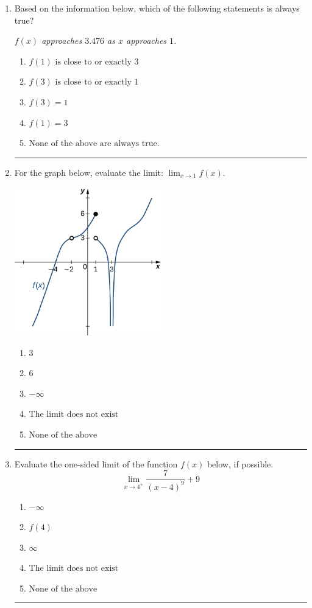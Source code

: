 \documentclass[14pt]{extbook}
\newcommand{\litem}[1]{\item#1\hspace*{-1cm}\rule{\textwidth}{0.4pt}}
\begin{document}
\begin{enumerate}
{\begin{enumerate}[label=\Alph*.]
\end{enumerate} }
\litem{
Based on the information below, which of the following statements is always true?
\begin{center}
    \textit{ $f(x)$ approaches $3.476$ as $x$ approaches $1$. }
\end{center}
\begin{enumerate}[label=\Alph*.]
\item \( f(1) \text{ is close to or exactly } 3 \)
\item \( f(3) \text{ is close to or exactly } 1 \)
\item \( f(3) = 1 \)
\item \( f(1) = 3 \)
\item \( \text{None of the above are always true.} \)

\end{enumerate} }
\litem{
For the graph below, evaluate the limit: $ \displaystyle \lim_{x \rightarrow 1} f(x)$.
\begin{center}
    \includegraphics[width=0.5\textwidth]{../Figures/evaluateLimitGraphicallyCopyC.png}
\end{center}
\begin{enumerate}[label=\Alph*.]
\item \( 3 \)
\item \( 6 \)
\item \( -\infty \)
\item \( \text{The limit does not exist} \)
\item \( \text{None of the above} \)

\end{enumerate} }
\litem{
Evaluate the one-sided limit of the function $f(x)$ below, if possible.\[ \lim_{x \rightarrow 4^+} \frac{7}{(x-4)^9}+9 \]\begin{enumerate}[label=\Alph*.]
\item \( -\infty \)
\item \( f(4) \)
\item \( \infty \)
\item \( \text{The limit does not exist} \)
\item \( \text{None of the above} \)


\end{enumerate}}
\end{enumerate}
\end{document}
